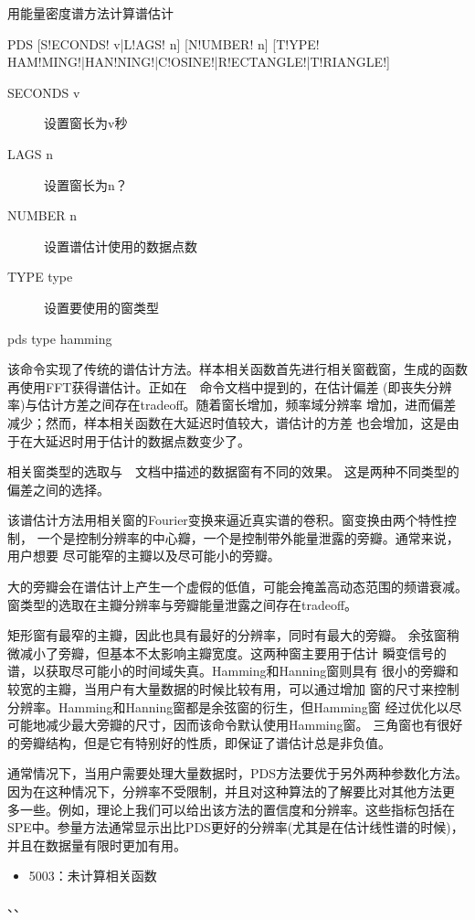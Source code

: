 \label{spe:pds}

用能量密度谱方法计算谱估计

\begin{SACSTX}
PDS [S!ECONDS! v|L!AGS! n] [N!UMBER! n]
    [T!YPE! HAM!MING!|HAN!NING!|C!OSINE!|R!ECTANGLE!|T!RIANGLE!]
\end{SACSTX}

\begin{description}
\item [SECONDS v] 设置窗长为v秒
\item [LAGS n] 设置窗长为n？
\item [NUMBER n] 设置谱估计使用的数据点数
\item [TYPE type] 设置要使用的窗类型
\end{description}

\begin{SACDFT}
pds type hamming
\end{SACDFT}

该命令实现了传统的谱估计方法。样本相关函数首先进行相关窗截窗，生成的函数
再使用FFT获得谱估计。正如在~~命令文档中提到的，在估计偏差
(即丧失分辨率)与估计方差之间存在tradeoff。随着窗长增加，频率域分辨率
增加，进而偏差减少；然而，样本相关函数在大延迟时值较大，谱估计的方差
也会增加，这是由于在大延迟时用于估计的数据点数变少了。

相关窗类型的选取与~~文档中描述的数据窗有不同的效果。
这是两种不同类型的偏差之间的选择。

该谱估计方法用相关窗的Fourier变换来逼近真实谱的卷积。窗变换由两个特性控制，
一个是控制分辨率的中心瓣，一个是控制带外能量泄露的旁瓣。通常来说，用户想要
尽可能窄的主瓣以及尽可能小的旁瓣。

大的旁瓣会在谱估计上产生一个虚假的低值，可能会掩盖高动态范围的频谱衰减。
窗类型的选取在主瓣分辨率与旁瓣能量泄露之间存在tradeoff。

矩形窗有最窄的主瓣，因此也具有最好的分辨率，同时有最大的旁瓣。
余弦窗稍微减小了旁瓣，但基本不太影响主瓣宽度。这两种窗主要用于估计
瞬变信号的谱，以获取尽可能小的时间域失真。Hamming和Hanning窗则具有
很小的旁瓣和较宽的主瓣，当用户有大量数据的时候比较有用，可以通过增加
窗的尺寸来控制分辨率。Hamming和Hanning窗都是余弦窗的衍生，但Hamming窗
经过优化以尽可能地减少最大旁瓣的尺寸，因而该命令默认使用Hamming窗。
三角窗也有很好的旁瓣结构，但是它有特别好的性质，即保证了谱估计总是非负值。

通常情况下，当用户需要处理大量数据时，PDS方法要优于另外两种参数化方法。
因为在这种情况下，分辨率不受限制，并且对这种算法的了解要比对其他方法更
多一些。例如，理论上我们可以给出该方法的置信度和分辨率。这些指标包括在
SPE中。参量方法通常显示出比PDS更好的分辨率(尤其是在估计线性谱的时候)，
并且在数据量有限时更加有用。

\begin{itemize}
\item 5003：未计算相关函数
\end{itemize}

、、
